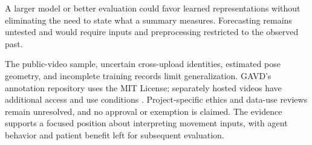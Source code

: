 \documentclass{article}
\begin{document}
A larger model or better evaluation could favor learned representations without eliminating the need to state what a summary measures. Forecasting remains untested and would require inputs and preprocessing restricted to the observed past.

The public-video sample, uncertain cross-upload identities, estimated pose geometry, and incomplete training records limit generalization. GAVD's annotation repository uses the MIT License; separately hosted videos have additional access and use conditions \citep{gavdRepo2026,gavdLicense}. Project-specific ethics and data-use reviews remain unresolved, and no approval or exemption is claimed. The evidence supports a focused position about interpreting movement inputs, with agent behavior and patient benefit left for subsequent evaluation.

\clearpage


\end{document}
